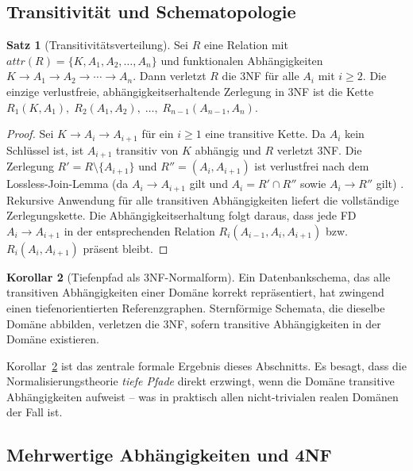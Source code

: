 ﻿\documentclass[12pt,a4paper]{article}
\theoremstyle{definition}
\newtheorem{theorem}{Satz}[section]
\newtheorem{corollary}[theorem]{Korollar}
\theoremstyle{remark}
\newcommand{\att}{\mathit{attr}}
\begin{document}
\subsection{Transitivität und Schematopologie}

\begin{theorem}[Transitivitätsverteilung]
\label{thm:transitivitaet}
Sei $R$ eine Relation mit $\att(R) = \{K, A_1, A_2, \ldots, A_n\}$ und
funktionalen Abhängigkeiten $K \to A_1 \to A_2 \to \cdots \to A_n$.
Dann verletzt $R$ die 3NF für alle $A_i$ mit $i \geq 2$.
Die einzige verlustfreie, abhängigkeitserhaltende Zerlegung in 3NF ist
die Kette $R_1(K, A_1),\; R_2(A_1, A_2),\; \ldots,\; R_{n-1}(A_{n-1}, A_n)$.
\end{theorem}

\begin{proof}
Sei $K \to A_i \to A_{i+1}$ für ein $i \geq 1$ eine transitive Kette.
Da $A_i$ kein Schlüssel ist, ist $A_{i+1}$ transitiv von $K$ abhängig und
$R$ verletzt 3NF. Die Zerlegung $R' = R \setminus \{A_{i+1}\}$ und
$R'' = (A_i, A_{i+1})$ ist verlustfrei nach dem Lossless-Join-Lemma
(da $A_i \to A_{i+1}$ gilt und $A_i = R' \cap R''$ sowie $A_i \to R''$ gilt)
\cite{Ullman1988}. Rekursive Anwendung für alle transitiven Abhängigkeiten
liefert die vollständige Zerlegungskette. Die Abhängigkeitserhaltung folgt
daraus, dass jede FD $A_i \to A_{i+1}$ in der entsprechenden Relation
$R_i(A_{i-1}, A_i, A_{i+1})$ bzw.\ $R_i(A_i, A_{i+1})$ präsent bleibt.
\end{proof}

\begin{corollary}[Tiefenpfad als 3NF-Normalform]
\label{cor:tiefenpfad3NF}
Ein Datenbankschema, das alle transitiven Abhängigkeiten einer Domäne
korrekt repräsentiert, hat zwingend einen tiefenorientierten Referenzgraphen.
Sternförmige Schemata, die dieselbe Domäne abbilden, verletzen die 3NF,
sofern transitive Abhängigkeiten in der Domäne existieren.
\end{corollary}

Korollar~\ref{cor:tiefenpfad3NF} ist das zentrale formale Ergebnis dieses
Abschnitts. Es besagt, dass die Normalisierungstheorie \emph{tiefe Pfade}
direkt erzwingt, wenn die Domäne transitive Abhängigkeiten aufweist --
was in praktisch allen nicht-trivialen realen Domänen der Fall ist.

\subsection{Mehrwertige Abhängigkeiten und 4NF}
\end{document}

